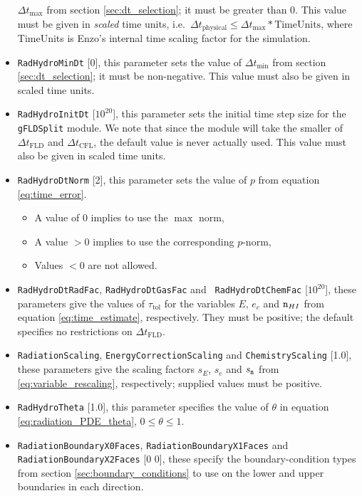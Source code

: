 \documentclass[letterpaper,10pt]{article}
\renewcommand{\(}{\left(}
\renewcommand{\)}{\right)}
\newcommand{\dt}{\Delta t}
\newcommand{\mn}{{\tt n}}
\begin{document}
\begin{itemize}
  $\dt_{\text{max}}$ from section \ref{sec:dt_selection}; it must be
  greater than 0.  This value must be given in {\em scaled} time units,   
  i.e.~$\dt_{\text{physical}} \le \dt_{\text{max}}*\text{TimeUnits}$, 
  where TimeUnits is Enzo's internal time scaling factor for the simulation.
\item {\tt RadHydroMinDt} [0], this parameter sets the value of
  $\dt_{\text{min}}$ from section \ref{sec:dt_selection}; it must be
  non-negative.  This value must also be given in scaled time
  units.
\item {\tt RadHydroInitDt} [$10^{20}$], this parameter sets the initial
  time step size for the {\tt gFLDSplit} module.  We note that since
  the module will take the smaller of $\dt_{\text{FLD}}$ and
  $\dt_{\text{CFL}}$, the default value is never actually used.  This
  value must also be given in scaled time units.
\item {\tt RadHydroDtNorm} [2], this parameter sets the value
  of $p$ from equation \eqref{eq:time_error}.  
  \begin{itemize}
  \item A value of $0$ implies to use the $\max$ norm, 
  \item A value $>0$ implies to use the corresponding $p$-norm,
  \item Values $<0$ are not allowed.
  \end{itemize}
\item {\tt RadHydroDtRadFac}, {\tt RadHydroDtGasFac} and {\tt
    RadHydroDtChemFac}  [$10^{20}$], these parameters give the values
  of $\tau_{\text{tol}}$ for the variables $E$, $e_c$ and $\mn_{HI}$
  from equation \eqref{eq:time_estimate}, respectively.  They must be
  positive; the default specifies no restrictions on $\dt_{\text{FLD}}$.
\item {\tt RadiationScaling}, {\tt EnergyCorrectionScaling} and 
  {\tt ChemistryScaling} [1.0], these parameters give the scaling 
  factors $s_E$, $s_e$ and $s_{\mn}$ from
  \eqref{eq:variable_rescaling}, respectively; supplied values must be
  positive. 
\item {\tt RadHydroTheta} [1.0], this parameter specifies the
  value of $\theta$ in equation \eqref{eq:radiation_PDE_theta},
  $0\le\theta\le 1$.
\item {\tt RadiationBoundaryX0Faces}, {\tt RadiationBoundaryX1Faces}
  and {\tt RadiationBoundaryX2Faces} [0 0], these specify the
  boundary-condition types from section \ref{sec:boundary_conditions}
  to use on the lower and upper boundaries in each direction.

\end{itemize}
\end{document}
